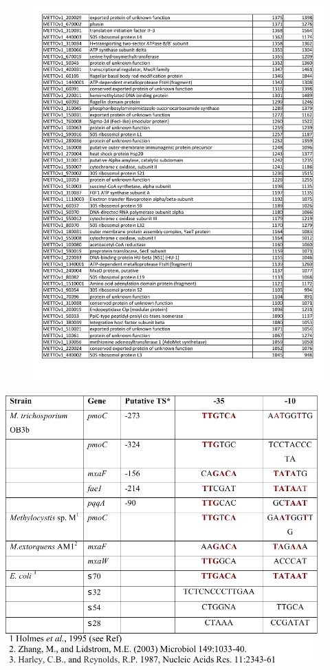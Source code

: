 \begin{figure}[H]
\centering
    \includegraphics[width=1.0\textwidth]{./tex/chapter1/figures/supplemental/TableS2d.pdf}
\end{figure}


\begin{table}[H]
\caption{Summary of putative transcription site mapping
	}
\label{table:ChA_S3}
\includegraphics[width=0.9\textwidth]{./tex/chapter1/figures/supplemental/TableS3.pdf}
\end{table}

